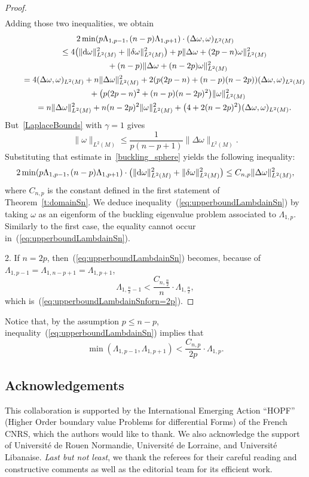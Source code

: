 \documentclass[pdftex]{sigma}
\numberwithin{equation}{section}
\theoremstyle{definition}
\begin{document}
\begin{proof}
\begin{gather*}
\end{gather*}
Adding those two inequalities, we obtain
\begin{gather}
\nonumber 2\min(p\Lambda_{1,p-1}, (n-p)\Lambda_{1,p+1})\cdot (\Delta\omega,\omega)_{L^2(M)}
\\
\nonumber\qquad{}\le{}4\bigl(\|{\rm d}\omega\|^2_{L^2(M)}+\|\delta\omega\|^2_{L^2(M)}\bigr)+p\|\Delta\omega+(2p-n)\omega\|^2_{L^2(M)}\\
\nonumber\qquad\quad{}+(n-p)\|\Delta\omega+(n-2p)\omega\|^2_{L^2(M)}
\\
\nonumber\qquad{}=4 (\Delta\omega,\omega )_{L^2(M)}+n\|\Delta\omega\|_{L^2(M)}^2 +2 (p(2p-n)+(n-p)(n-2p) ) (\Delta\omega,\omega )_{L^2(M)}\\
\nonumber\qquad\quad{}+\bigl(p(2p-n)^2+(n-p)(n-2p)^2\bigr)\|\omega\|_{L^2(M)}^2\\
\qquad{}=n\|\Delta\omega\|^2_{L^2(M)}+n(n-2p)^2\|\omega\|^2_{L^2(M)}+\bigl(4+2(n-2p)^2\bigr)(\Delta\omega,\omega)_{L^2(M)}.\label{buckling_sphere}
\end{gather}
But~\eqref{LaplaceBounds} with $\gamma=1$ gives
\[\|\omega\|_{L^2(M)} \le \frac{1}{p(n-p+1)} \|\Delta \omega\|_{L^2(M)}.\]
Substituting that estimate in~\eqref{buckling_sphere} yields the following inequality:
\[2 \min(p\Lambda_{1,p-1}, (n-p)\Lambda_{1,p+1})\cdot\bigl(\|{\rm d}\omega\|_{L^2(M)}^2+\|\delta\omega\|_{L^2(M)}^2\bigr) \le C_{n,p} \|\Delta \omega\|^2_{L^2(M)},\]
where $C_{n,p}$ is the constant defined in the first statement of Theorem~\ref{t:domainSn}.
We deduce inequality~(\ref{eq:upperboundLambdainSn}) by taking $\omega$ as an eigenform of the buckling eigenvalue problem associated to $\Lambda_{1,p}$. Similarly to the first case, the equality cannot occur in~(\ref{eq:upperboundLambdainSn}).

2. If $n=2p$, then~(\ref{eq:upperboundLambdainSn}) becomes, because of $\Lambda_{1,p-1}=\Lambda_{1,n-p+1}=\Lambda_{1,p+1}$,
\[\Lambda_{1,\frac{n}{2}-1}<\frac{C_{n,\frac{n}{2}}}{n}\cdot\Lambda_{1,\frac{n}{2}},\]
which is~(\ref{eq:upperboundLambdainSnforn=2p}).
\end{proof}

Notice that, by the assumption $p\leq n-p$, inequality~(\ref{eq:upperboundLambdainSn}) implies that
\[\min(\Lambda_{1,p-1},\Lambda_{1,p+1})< \frac{C_{n,p}}{2p}\cdot\Lambda_{1,p}.\]

\subsection*{Acknowledgements}
This collaboration is supported by the International Emerging Action ``HOPF'' (Higher Order boundary value Problems for differential Forms) of the French CNRS, which the authors would like to thank.
We also acknowledge the support of Universit\'e de Rouen Normandie, Universit\'e de Lorraine, and Universit\'e Libanaise.
{\sl Last but not least}, we thank the referees for their careful reading and constructive comments as well as the editorial team for its efficient work.
\end{document}
